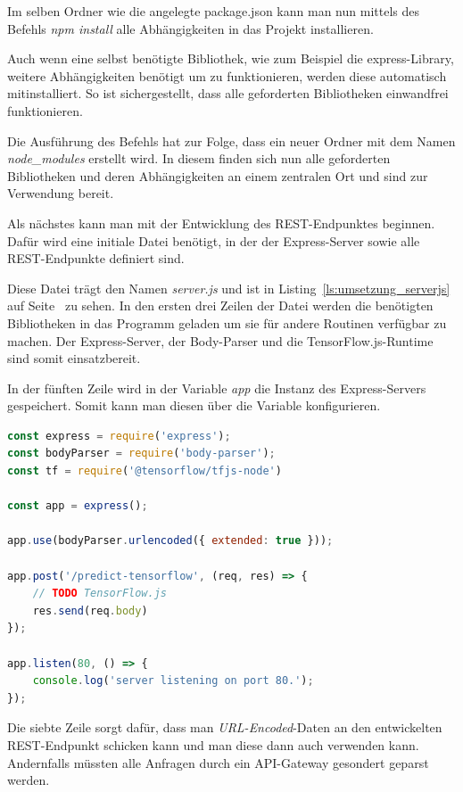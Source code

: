 Im selben Ordner wie die angelegte package.json kann man nun mittels des Befehls \textit{npm install} alle
Abhängigkeiten in das Projekt installieren.

Auch wenn eine selbst benötigte Bibliothek, wie zum Beispiel die express-Library, weitere Abhängigkeiten benötigt um zu
funktionieren, werden diese automatisch mitinstalliert. So ist sichergestellt, dass alle geforderten Bibliotheken
einwandfrei funktionieren.

Die Ausführung des Befehls hat zur Folge, dass ein neuer Ordner mit dem Namen \textit{node\_modules} erstellt wird. In
diesem finden sich nun alle geforderten Bibliotheken und deren Abhängigkeiten an einem zentralen Ort und sind zur
Verwendung bereit.

Als nächstes kann man mit der Entwicklung des REST-Endpunktes beginnen. Dafür wird eine initiale Datei benötigt, in der
der Express-Server sowie alle REST-Endpunkte definiert sind.

Diese Datei trägt den Namen \textit{server.js} und ist in Listing~\ref{ls:umsetzung_serverjs} auf 
Seite~\pageref{ls:umsetzung_serverjs} zu sehen. In den ersten drei Zeilen der Datei werden die benötigten Bibliotheken
in das Programm geladen um sie für andere Routinen verfügbar zu machen. Der Express-Server, der Body-Parser und die
TensorFlow.js-Runtime sind somit einsatzbereit.

In der fünften Zeile wird in der Variable \textit{app} die Instanz des Express-Servers gespeichert. Somit kann man
diesen über die Variable konfigurieren.

\begin{lstlisting}[language=JavaScript, caption=Die komplette server.js, label=ls:umsetzung_serverjs]
const express = require('express');
const bodyParser = require('body-parser');
const tf = require('@tensorflow/tfjs-node')

const app = express();

app.use(bodyParser.urlencoded({ extended: true }));

app.post('/predict-tensorflow', (req, res) => {
    // TODO TensorFlow.js
    res.send(req.body)
});

app.listen(80, () => {
    console.log('server listening on port 80.');
});
\end{lstlisting}

Die siebte Zeile sorgt dafür, dass man \textit{URL-Encoded}-Daten an den entwickelten REST-Endpunkt schicken kann und
man diese dann auch verwenden kann. Andernfalls müssten alle Anfragen durch ein API-Gateway gesondert geparst werden.

